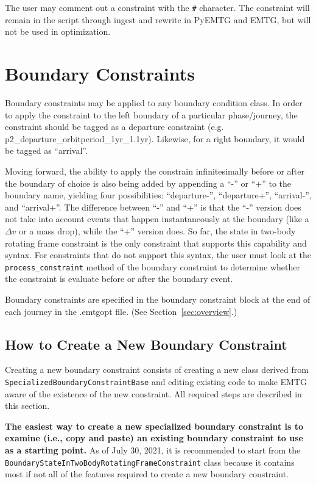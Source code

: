 \documentclass[11pt]{article}
\begin{document}
The user may comment out a constraint with the \texttt{\#} character. The constraint will remain in the script through ingest and rewrite in PyEMTG and EMTG, but will not be used in optimization.

\section{Boundary Constraints}
\label{sec:boundaryConstraints}

Boundary constraints may be applied to any boundary condition class. In order to apply the constraint to the left boundary of a particular phase/journey, the constraint should be tagged as a departure constraint (e.g. p2\_departure\_orbitperiod\_1yr\_1.1yr). Likewise, for a right boundary, it would be tagged as ``arrival''. 

Moving forward, the ability to apply the constrain infinitesimally before or after the boundary of choice is also being added by appending a ``-'' or ``+'' to the boundary name, yielding four possibilities: ``departure-'', ``departure+'', ``arrival-'', and ``arrival+''. The difference between ``-'' and ``+'' is that the ``-'' version does not take into account events that happen instantaneously at the boundary (like a $\Delta v$ or a mass drop), while the ``+'' version does. So far, the state in two-body rotating frame constraint is the only constraint that supports this capability and syntax. For constraints that do not support this syntax, the user must look at the \texttt{process\_constraint} method of the boundary constraint to determine whether the constraint is evaluate before or after the boundary event.

Boundary constraints are specified in the boundary constraint block at the end of each journey in the .emtgopt file. (See Section~\ref{sec:overview}.)

\subsection{How to Create a New Boundary Constraint}
\label{sec:howToCreateANewBoundaryConstraint}

Creating a new boundary constraint consists of creating a new class derived from \texttt{SpecializedBoundaryConstraintBase} and editing existing code to make EMTG aware of the existence of the new constraint. All required steps are described in this section.

\textbf{The easiest way to create a new specialized boundary constraint is to examine (i.e., copy and paste) an existing boundary constraint to use as a starting point.} As of July 30, 2021, it is recommended to start from the \texttt{BoundaryStateInTwoBodyRotatingFrameConstraint} class because it contains most if not all of the features required to create a new boundary constraint.
\end{document}
